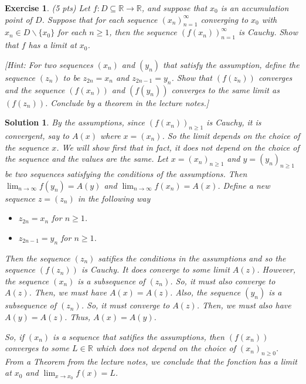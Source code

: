 \documentclass[12pt]{article}
\newcommand{\bR}{\mathbb{R}}
\newcommand{\ra}{\rightarrow}
\theoremstyle{plain}
\newtheorem{exer}{\textbf{Exercise}}}
\theoremstyle{plain}
\newtheorem*{sol}{\textbf{Solution}}}
\theoremstyle{plain}
\theoremstyle{plain}
\begin{document}
\begin{exer}
(5 pts)
Let $f: D \subseteq \bR \ra \bR$, and suppose that $x_0$ is an accumulation point of $D$. Suppose that for each sequence $(x_n)_{n = 1}^\infty$ converging to $x_0$ with $x_n \in D\backslash \{ x_0 \}$ for each $n \geq 1$, then the sequence $(f(x_n))_{n = 1}^\infty$ is Cauchy. Show that $f$ has a limit at $x_0$.

[Hint: For two sequences $(x_n)$ and $(y_n)$ that satisfy the assumption, define the sequence $(z_n)$ to be $z_{2n} = x_n$ and $z_{2n - 1} = y_n$. Show that $(f(z_n))$ converges and the sequence $(f(x_n))$ and $(f(y_n))$ converges to the same limit as $(f(z_n))$. Conclude by a theorem in the lecture notes.]
\end{exer}
\begin{sol}
By the assumptions, since $(f(x_n))_{n \geq 1}$ is Cauchy, it is convergent, say to $A (x)$ where $x = (x_n)$. So the limit depends on the choice of the sequence $x$. We will show first that in fact, it does not depend on the choice of the sequence and the values are the same. Let $x = (x_n)_{n \geq 1}$ and $y = (y_n)_{n \geq 1}$ be two sequences satisfying the conditions of the assumptions. Then $\lim_{n \ra \infty} f(y_n) = A(y)$ and $\lim_{n \ra \infty} f(x_n) = A(x)$. Define a new sequence $z = (z_n)$ in the following way
	\begin{itemize}
	\item $z_{2n} = x_n$ for $n \geq 1$.
	\item $z_{2n -1} = y_n$ for $n \geq 1$.
	\end{itemize}
Then the sequence $(z_n)$ satifies the conditions in the assumptions and so the sequence $(f(z_n))$ is Cauchy. It does converge to some limit $A(z)$. However, the sequence $(x_n)$ is a subsequence of $(z_n)$. So, it must also converge to $A(z)$. Then, we must have $A(x) = A(z)$. Also, the sequence $(y_n)$ is a subsequence of $(z_n)$. So, it must converge to $A(z)$. Then, we must also have $A(y) = A(z)$. Thus, $A(x) = A(y)$. 

So, if $(x_n)$ is a sequence that satifies the assumptions, then $(f(x_n))$ converges to some $L \in \bR$ which does not depend on the choice of $(x_n)_{n \geq 0}$. From a Theorem from the lecture notes, we conclude that the fonction has a limit at $x_0$ and $\lim_{x \ra x_0} f(x) = L$.
\end{sol}
\end{document}

